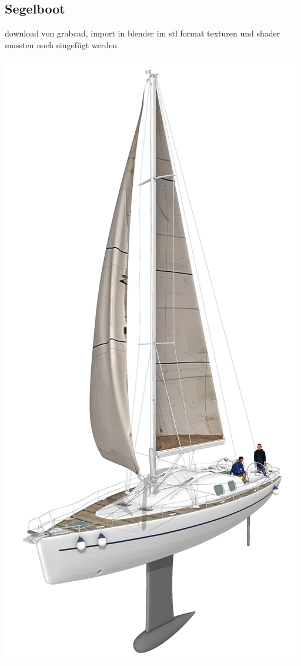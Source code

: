 \subsection{Segelboot}

download von grabcad, import in blender im stl format
texturen und shader mussten noch eingefügt werden

\includegraphics[width=\textwidth]{gfx/prod/boat/boat.jpg}


